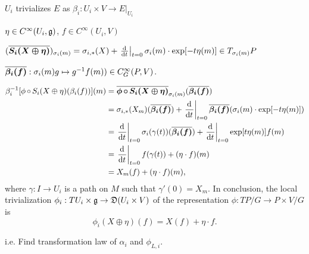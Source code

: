 \begin{example}[Local trivialization of representation of $TP/G$ on $E = P \times V/G$]\label{localTrivializationOfRepresentationOfAtiyahTPGonAssociated}
\label{exampleLocalTrivializationOfGroupInducedRepresentationOfAtiyahLieAlgebroidAction}
$U_i$ trivializes $E$ as $\beta_i: U_i \times V\to E|_{U_i}$

$\eta \in C^\infty(U_i, \mathfrak{g})$, $f \in C^\infty(U_i, V)$

$(\upsect{S_i(X \oplus \eta)})_{\sigma_i(m)} = \sigma_{i, *}(X) + \der{t}[t=0]{\sigma_i(m) \cdot \exp[-t \eta(m)]} \in T_{\sigma_i(m)} P$


$\overline{\bm{\beta_i(f)}}: \sigma_i(m)g \mapsto g^{-1} f(m)) \in C^\infty_G(P, V)$.


\begin{align*}
    \beta_i^{-1}[\phi\comp S_i(X \oplus \eta)(\beta_i(f))] (m)
        &= \upsect{\phi \comp S_i(X \oplus \eta)}_{\sigma_i(m)} (\upsect{\beta_i(f)})\\
        &= \sigma_{i, *}(X_m)(\upsect{\beta_i(f)}) 
        + \der{t}[t = 0]{\upsect{\beta_i(f)}(\sigma_i(m) \cdot \exp[-t \eta(m)])}\\
        &= \der{t}[t = 0]{\sigma_i(\gamma(t))} (\upsect{\beta_i(f)}) + \der{t}[t=0]{\exp[t \eta(m)] f(m)}\\
        &= \der{t}[t=0]{f(\gamma(t))} + (\eta \cdot f)(m)\\
        &= X_m(f) + (\eta \cdot f)(m),
\end{align*}
where $\gamma: I \to U_i$ is a path on $M$ such that $\gamma'(0) = X_m$. In conclusion, the local trivialization $\phi_i: TU_i \times \alg g \to \alg D(U_i \times V)$ of the representation $\phi: TP/G \to P \times V/G$ is
\begin{equation}\label{equationLocalRepresentationAtiyahLieAlgebroidOnAssociatedVectorBundleExpectedTrivialALgebroidRepresentationActionOfGroup}
    \phi_i(X \oplus \eta)(f) = X(f) + \eta \cdot f.
\end{equation}
\end{example}


\begin{example}
\label{transformationLawFamilyLocalTrivializationsRepresentationsOfTransitiveLieAlgebroid}
i.e. Find transformation law of $\alpha_i$ and $\phi_{L, i}$.
\end{example}

